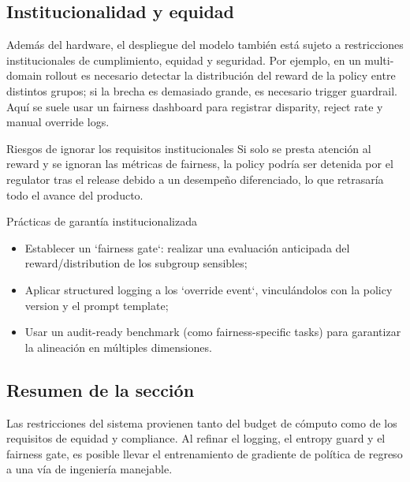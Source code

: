 \subsection{Institucionalidad y equidad}
Además del hardware, el despliegue del modelo también está sujeto a restricciones institucionales de cumplimiento, equidad y seguridad. Por ejemplo, en un multi-domain rollout es necesario detectar la distribución del reward de la policy entre distintos grupos; si la brecha es demasiado grande, es necesario trigger guardrail. Aquí se suele usar un fairness dashboard para registrar disparity, reject rate y manual override logs.

\begin{warningbox}{Riesgos de ignorar los requisitos institucionales}
Si solo se presta atención al reward y se ignoran las métricas de fairness, la policy podría ser detenida por el regulator tras el release debido a un desempeño diferenciado, lo que retrasaría todo el avance del producto.
\end{warningbox}

\begin{knowledgebox}{Prácticas de garantía institucionalizada}
\begin{itemize}
    \item Establecer un `fairness gate`: realizar una evaluación anticipada del reward/distribution de los subgroup sensibles;
    \item Aplicar structured logging a los `override event`, vinculándolos con la policy version y el prompt template;
    \item Usar un audit-ready benchmark (como fairness-specific tasks) para garantizar la alineación en múltiples dimensiones.
\end{itemize}
\end{knowledgebox}

\subsection{Resumen de la sección}
Las restricciones del sistema provienen tanto del budget de cómputo como de los requisitos de equidad y compliance. Al refinar el logging, el entropy guard y el fairness gate, es posible llevar el entrenamiento de gradiente de política de regreso a una vía de ingeniería manejable.

